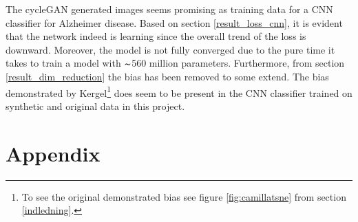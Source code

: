 \documentclass[12pt, fleqn, titlepage]{article}
\newcommand{\1}[1]{\mathds{1}\left[#1\right]}
\begin{document}
The cycleGAN generated images seems promising as training data for a CNN classifier for Alzheimer disease. Based on section \ref{result_loss_cnn}, it is evident that the network indeed is learning since the overall trend of the loss is downward. Moreover, the model is not fully converged due to the pure time it takes to train a model with  $ \thicksim $560 million parameters. Furthermore, from section \ref{result_dim_reduction} the bias has been removed to some extend. The bias demonstrated by Kergel\footnote{To see the original demonstrated bias see figure \ref{fig:camillatsne} from section \ref{indledning}.} does seem to be present in the CNN classifier trained on synthetic and original data in this project. 


%




\newpage
\section{Appendix}\label{appendix}
\end{document}
